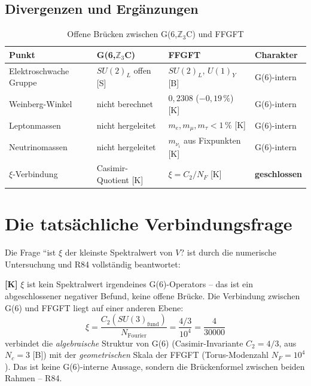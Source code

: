 \subsection{Divergenzen und Ergänzungen}

\begin{table}[h]
\centering
\caption{Offene Brücken zwischen G(6,$\mathbb{Z}_3$C) und FFGFT}
\label{tab:offen}
\begin{tabular}{llll}
\toprule
Punkt & G(6,$\mathbb{Z}_3$C) & FFGFT & Charakter \\
\midrule
Elektroschwache Gruppe & $SU(2)_L$ offen [S] & $SU(2)_L$, $U(1)_Y$ [B] & G(6)-intern \\
Weinberg-Winkel & nicht berechnet & $0{,}2308$ ($-0{,}19\,\%$) [K] & G(6)-intern \\
Leptonmassen & nicht hergeleitet & $m_e, m_\mu, m_\tau < 1\,\%$ [K] & G(6)-intern \\
Neutrinomassen & nicht hergeleitet & $m_{\nu_i}$ aus Fixpunkten [K] & G(6)-intern \\
$\xi$-Verbindung & Casimir-Quotient [K] & $\xi = C_2/N_F$ [K] & \textbf{geschlossen} \\
\bottomrule
\end{tabular}
\end{table}

\section{Die tatsächliche Verbindungsfrage}

Die Frage ``ist $\xi$ der kleinste Spektralwert von $V$?
ist durch die numerische Untersuchung und R84 vollständig beantwortet:

\textbf{[K]} $\xi$ ist kein Spektralwert irgendeines G(6)-Operators
-- das ist ein abgeschlossener negativer Befund, keine offene Brücke.
Die Verbindung zwischen G(6) und FFGFT liegt auf einer anderen Ebene:
\begin{equation}
  \xi = \frac{C_2(SU(3)_{\text{fund}})}{N_{\text{Fourier}}}
      = \frac{4/3}{10^4} = \frac{4}{30000}
\end{equation}
verbindet die \emph{algebraische} Struktur von G(6) (Casimir-Invariante
$C_2 = 4/3$, aus $N_c=3$ [B]) mit der \emph{geometrischen} Skala der
FFGFT (Torus-Modenzahl $N_F = 10^4$). Das ist keine G(6)-interne Aussage,
sondern die Brückenformel zwischen beiden Rahmen -- R84.

